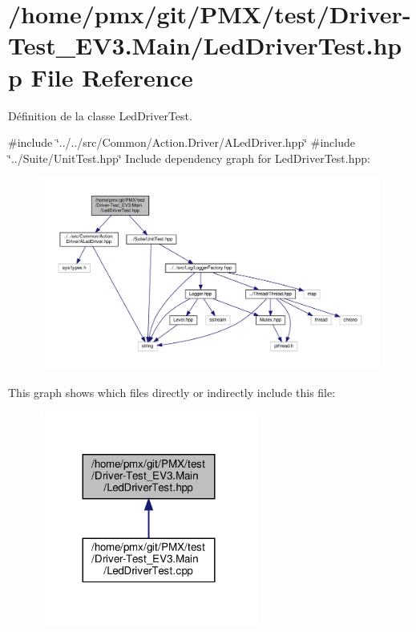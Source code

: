 \hypertarget{Driver-Test__EV3_8Main_2LedDriverTest_8hpp}{}\section{/home/pmx/git/\+P\+M\+X/test/\+Driver-\/\+Test\+\_\+\+E\+V3.Main/\+Led\+Driver\+Test.hpp File Reference}
\label{Driver-Test__EV3_8Main_2LedDriverTest_8hpp}


Définition de la classe Led\+Driver\+Test.  


{\ttfamily \#include \char`\"{}../../src/\+Common/\+Action.\+Driver/\+A\+Led\+Driver.\+hpp\char`\"{}}\newline
{\ttfamily \#include \char`\"{}../\+Suite/\+Unit\+Test.\+hpp\char`\"{}}\newline
Include dependency graph for Led\+Driver\+Test.\+hpp\+:
\nopagebreak
\begin{figure}[H]
\begin{center}
\leavevmode
\includegraphics[width=350pt]{Driver-Test__EV3_8Main_2LedDriverTest_8hpp__incl}
\end{center}
\end{figure}
This graph shows which files directly or indirectly include this file\+:
\nopagebreak
\begin{figure}[H]
\begin{center}
\leavevmode
\includegraphics[width=203pt]{Driver-Test__EV3_8Main_2LedDriverTest_8hpp__dep__incl}
\end{center}
\end{figure}
